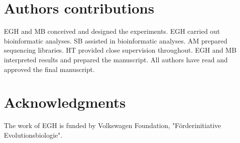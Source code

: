 \documentclass[10pt]{bmc_article}
\newenvironment{bmcformat}{\begin{raggedright}\baselineskip20pt\sloppy\setboolean{publ}{false}}{\end{raggedright}\baselineskip20pt\sloppy}
\begin{document}
\begin{bmcformat}
\section*{Authors contributions}

EGH and MB conceived and designed the experiments. EGH carried out
bioinformatic analyses. SB assisted in bioinformatic analyses. AM
prepared sequencing libraries. HT provided close supervision
throughout. EGH and MB interpreted results and prepared the
manuscript. All authors have read and approved the final manuscript.

\section*{Acknowledgments}

The work of EGH is funded by Volkswagen Foundation,
"F\"{o}rderinitiative Evolutionsbiologie".
 

{
  
} %



\newpage


\end{bmcformat}
\end{document}
